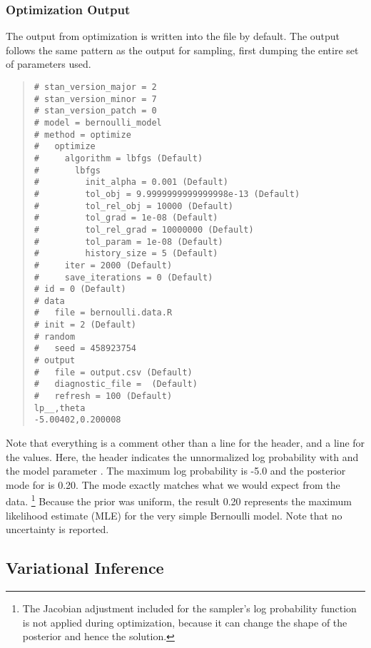 \subsubsection{Optimization Output}

The output from optimization is written into the file
 by default.  The output follows the same pattern as the
output for sampling, first dumping the entire set of parameters used.
%
\begin{quote}
\begin{Verbatim}[fontsize=\small]
# stan_version_major = 2
# stan_version_minor = 7
# stan_version_patch = 0
# model = bernoulli_model
# method = optimize
#   optimize
#     algorithm = lbfgs (Default)
#       lbfgs
#         init_alpha = 0.001 (Default)
#         tol_obj = 9.9999999999999998e-13 (Default)
#         tol_rel_obj = 10000 (Default)
#         tol_grad = 1e-08 (Default)
#         tol_rel_grad = 10000000 (Default)
#         tol_param = 1e-08 (Default)
#         history_size = 5 (Default)
#     iter = 2000 (Default)
#     save_iterations = 0 (Default)
# id = 0 (Default)
# data
#   file = bernoulli.data.R
# init = 2 (Default)
# random
#   seed = 458923754
# output
#   file = output.csv (Default)
#   diagnostic_file =  (Default)
#   refresh = 100 (Default)
lp__,theta
-5.00402,0.200008
\end{Verbatim}
\end{quote}
%
Note that everything is a comment other than a line for the header,
and a line for the values.  Here, the header indicates the
unnormalized log probability with  and the model
parameter .  The maximum log probability is -5.0 and the
posterior mode for  is 0.20.  The mode exactly matches
what we would expect from the data.%
%
\footnote{The Jacobian adjustment included for the sampler's log
  probability function is not applied during optimization, because it can
  change the shape of the posterior and hence the solution.}
%
Because the prior was uniform, the result 0.20 represents the maximum
likelihood estimate (MLE) for the very simple Bernoulli model.  Note
that no uncertainty is reported.

\subsection{Variational Inference}

